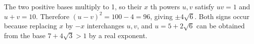 The two positive bases multiply to 1, so their $ x $ th powers $ u,v $ satisfy $ uv=1 $ and $ u+v=10 $. Therefore $(u-v)^2=100-4=96 $, giving $\boxed{\pm4\sqrt6}$. Both signs occur because replacing $ x $ by $-x $ interchanges $ u,v $, and $ u=5+2\sqrt6 $ can be obtained from the base $ 7+4\sqrt3>1 $ by a real exponent.
